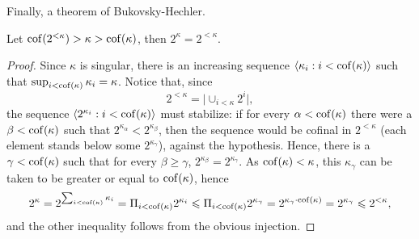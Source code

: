 \documentclass[twoside,openright,titlepage,numbers=noenddot,%
               headinclude,footinclude,cleardoublepage=empty,abstract=on,
               BCOR=23mm,paper=letter,fontsize=11pt
               ]{scrreprt}
\begin{document}
Finally, a theorem of Bukovsky-Hechler.
\begin{theorem}
    Let $\mathrm{cof}(2^{<\kappa}) > \kappa > \mathrm{cof}(\kappa)$, then $2^\kappa = 2^{<\kappa}$.
\end{theorem}
\begin{proof}
    Since $\kappa$ is singular, there is an increasing sequence $\langle \kappa_i: i < \mathrm{cof}(\kappa) \rangle$ such that $\sup_{i < \mathrm{cof}(\kappa)} \kappa_i = \kappa$. Notice that, since
    \[ 2^{<\kappa} = \vert \cup_{i < \kappa} 2^{i} \vert, \]
    the sequence $\langle 2^{\kappa_i}: i < \mathrm{cof}(\kappa)\rangle$ must stabilize: if for every $\alpha < \mathrm{cof}(\kappa)$ there were a $\beta < \mathrm{cof}(\kappa)$ such that $2^{\kappa_\alpha} < 2^{\kappa_\beta}$, then the sequence would be cofinal in $2^{< \kappa}$ (each element stands below some $2^{\kappa_\gamma}$), against the hypothesis. Hence, there is a $\gamma < \mathrm{cof}(\kappa)$ such that for every $\beta \geq \gamma$, $2^{\kappa_\beta} = 2^{\kappa_\gamma}$. As $\mathrm{cof}(\kappa) < \kappa$, this $\kappa_\gamma$ can be taken to be greater or equal to $\mathrm{cof}(\kappa)$, hence
    \[ 2^{\kappa} = 2^{\sum_{i < \mathrm{cof}(\kappa)} \kappa_i} = \Pi_{i < \mathrm{cof}(\kappa)} 2^{\kappa_i} \leqslant \Pi_{i < \mathrm{cof}(\kappa)} 2^{\kappa_\gamma} = 2^{\kappa_\gamma \cdot \mathrm{cof}(\kappa)} = 2^{\kappa_\gamma} \leqslant 2^{< \kappa}, \]
    and the other inequality follows from the obvious injection.
\end{proof}
\end{document}

